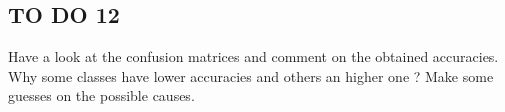 \documentclass[11pt]{article}
\begin{document}
    \hypertarget{to-do-12}{%
\subsection{TO DO 12}\label{to-do-12}}

Have a look at the confusion matrices and comment on the obtained
accuracies. Why some classes have lower accuracies and others an higher
one ? Make some guesses on the possible causes.


    
    
    
    
\end{document}
